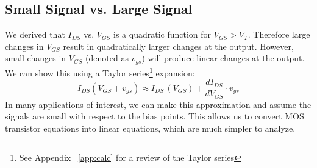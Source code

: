 \subsection{Small Signal vs. Large Signal}
We derived that $I_{DS}$ vs. $V_{GS}$ is a quadratic function for $V_{GS} > V_T$.  Therefore large changes in $V_{GS}$ result in quadratically larger changes at the output.  However, small changes in $V_{GS}$ (denoted as $v_{gs}$) will produce linear changes at the output.  We can show this using a Taylor series\footnote{See Appendix ~\ref{app:calc} for a review of the Taylor series} expansion:
    \begin{equation}
        I_{DS}(V_{GS} + v_{gs}) \approx I_{DS}\,(V_{GS}) + \frac{dI_{DS}}{dV_{GS}} \cdot v_{gs}
    \end{equation}
In many applications of interest, we can make this approximation and assume the signals are small with respect to the bias points.  This allows us to convert MOS transistor equations into linear equations, which are much simpler to analyze.
